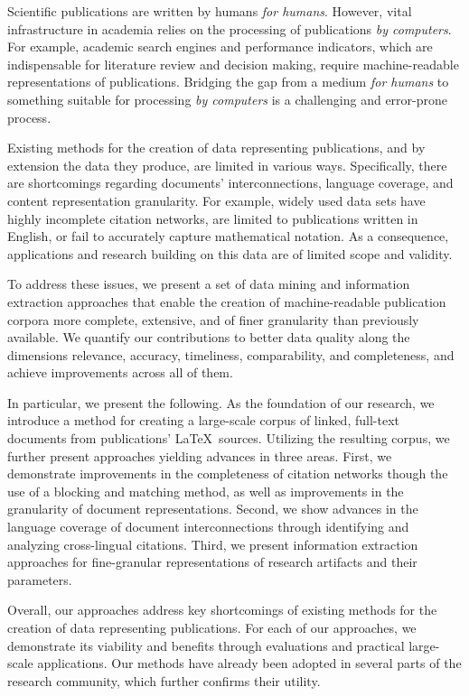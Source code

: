 \Abstract{}
Scientific publications are written by humans \emph{for humans}.
However, vital infrastructure in academia relies on the processing of publications \emph{by computers}.
For example, academic search engines and performance indicators, which are indispensable for literature review and decision making, require machine-readable representations of publications.
Bridging the gap from a medium \emph{for humans} to something suitable for processing \emph{by computers} is a challenging and error-prone process.

Existing methods for the creation of data representing publications, and by extension the data they produce, are limited in various ways. Specifically, there are shortcomings regarding documents' interconnections, language coverage, and content representation granularity. For example, widely used data sets have highly incomplete citation networks, are limited to publications written in English, or fail to accurately capture mathematical notation. As a consequence, applications and research building on this data are of limited scope and validity.

To address these issues, we present a set of data mining and information extraction approaches that enable the creation of machine-readable publication corpora more complete, extensive, and of finer granularity than previously available. We quantify our contributions to better data quality along the dimensions relevance, accuracy, timeliness, comparability, and completeness, and achieve improvements across all of them.

In particular, we present the following.
As the foundation of our research, we introduce a method for creating a large-scale corpus of linked, full-text documents from publications' \LaTeX\ sources.
Utilizing the resulting corpus, we further present approaches yielding advances in three areas.
First, we demonstrate improvements in the completeness of citation networks though the use of a blocking and matching method, as well as improvements in the granularity of document representations.
Second, we show advances in the language coverage of document interconnections through identifying and analyzing cross-lingual citations.
Third, we present information extraction approaches for fine-granular representations of research artifacts and their parameters.

Overall, our approaches address key shortcomings of existing methods for the creation of data representing publications.
For each of our approaches, we demonstrate its viability and benefits through evaluations and practical large-scale applications.
Our methods have already been adopted in several parts of the research community, which further confirms their utility.
